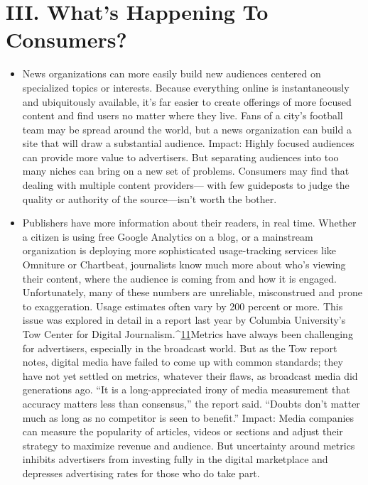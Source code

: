 \section{III. What's Happening To Consumers?}
\begin{itemize}
\item News organizations can more easily build new audiences centered on
specialized topics or interests. Because everything online is instantaneously
and ubiquitously available, it's far easier to create offerings of more focused
content and find users no matter where they live. Fans of a city's football
team may be spread around the world, but a news organization can build a
site that will draw a substantial audience.
Impact: Highly focused audiences can provide more value to advertisers. But
separating audiences into too many niches can bring on a new set of problems.
Consumers may find that dealing with multiple content providers—
with few guideposts to judge the quality or authority of the source—isn't
worth the bother.
\item Publishers have more information about their readers, in real time.
Whether a citizen is using free Google Analytics on a blog, or a mainstream
organization is deploying more sophisticated usage-tracking services like
Omniture or Chartbeat, journalists know much more about who's viewing
their content, where the audience is coming from and how it is engaged.
Unfortunately, many of these numbers are unreliable, misconstrued
and prone to exaggeration. Usage estimates often vary by 200 percent or
more. This issue was explored in detail in a report last year by Columbia
University's Tow Center for Digital Journalism.^{\href{#endnotes-chapter-1}{11}}Metrics have always been
challenging for advertisers, especially in the broadcast world. But as the Tow
report notes, digital media have failed to come up with common standards;
they have not yet settled on metrics, whatever their flaws, as broadcast media
did generations ago. ``It is a long-appreciated irony of media measurement
that accuracy matters less than consensus,'' the report said. ``Doubts don't
matter much as long as no competitor is seen to benefit.''
Impact: Media companies can measure the popularity of articles, videos or
sections and adjust their strategy to maximize revenue and audience. But uncertainty
around metrics inhibits advertisers from investing fully in the digital
marketplace and depresses advertising rates for those who do take part.


\end{itemize}
